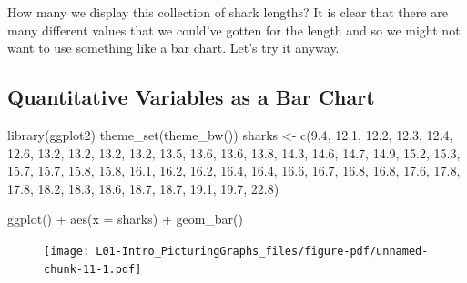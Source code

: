 \documentclass[
  letterpaper,
  DIV=11,
  numbers=noendperiod,
  oneside]{scrreprt}
\newenvironment{Shaded}{\begin{snugshade}}{\end{snugshade}}
\newcommand{\AttributeTok}[1]{\textcolor[rgb]{0.40,0.45,0.13}{#1}}
\newcommand{\FloatTok}[1]{\textcolor[rgb]{0.68,0.00,0.00}{#1}}
\newcommand{\FunctionTok}[1]{\textcolor[rgb]{0.28,0.35,0.67}{#1}}
\newcommand{\NormalTok}[1]{\textcolor[rgb]{0.00,0.23,0.31}{#1}}
\newcommand{\OtherTok}[1]{\textcolor[rgb]{0.00,0.23,0.31}{#1}}
\newcommand{\SpecialCharTok}[1]{\textcolor[rgb]{0.37,0.37,0.37}{#1}}
\begin{document}
How many we display this collection of shark lengths? It is clear that
there are many different values that we could've gotten for the length
and so we might not want to use something like a bar chart. Let's try it
anyway.

\hypertarget{quantitative-variables-as-a-bar-chart}{%
\subsection{Quantitative Variables as a Bar
Chart}\label{quantitative-variables-as-a-bar-chart}}

\begin{Shaded}
\begin{Highlighting}[]
\FunctionTok{library}\NormalTok{(ggplot2)}
\FunctionTok{theme\_set}\NormalTok{(}\FunctionTok{theme\_bw}\NormalTok{())}
\NormalTok{sharks }\OtherTok{\textless{}{-}}  \FunctionTok{c}\NormalTok{(}\FloatTok{9.4}\NormalTok{, }\FloatTok{12.1}\NormalTok{, }\FloatTok{12.2}\NormalTok{, }\FloatTok{12.3}\NormalTok{, }\FloatTok{12.4}\NormalTok{, }\FloatTok{12.6}\NormalTok{, }\FloatTok{13.2}\NormalTok{, }\FloatTok{13.2}\NormalTok{, }\FloatTok{13.2}\NormalTok{, }\FloatTok{13.2}\NormalTok{, }\FloatTok{13.5}\NormalTok{,}
\FloatTok{13.6}\NormalTok{, }\FloatTok{13.6}\NormalTok{, }\FloatTok{13.8}\NormalTok{, }\FloatTok{14.3}\NormalTok{, }\FloatTok{14.6}\NormalTok{, }\FloatTok{14.7}\NormalTok{, }\FloatTok{14.9}\NormalTok{, }\FloatTok{15.2}\NormalTok{, }\FloatTok{15.3}\NormalTok{, }\FloatTok{15.7}\NormalTok{, }\FloatTok{15.7}\NormalTok{,}
\FloatTok{15.8}\NormalTok{, }\FloatTok{15.8}\NormalTok{, }\FloatTok{16.1}\NormalTok{, }\FloatTok{16.2}\NormalTok{, }\FloatTok{16.2}\NormalTok{, }\FloatTok{16.4}\NormalTok{, }\FloatTok{16.4}\NormalTok{, }\FloatTok{16.6}\NormalTok{, }\FloatTok{16.7}\NormalTok{, }\FloatTok{16.8}\NormalTok{, }\FloatTok{16.8}\NormalTok{,}
\FloatTok{17.6}\NormalTok{, }\FloatTok{17.8}\NormalTok{, }\FloatTok{17.8}\NormalTok{, }\FloatTok{18.2}\NormalTok{, }\FloatTok{18.3}\NormalTok{, }\FloatTok{18.6}\NormalTok{, }\FloatTok{18.7}\NormalTok{, }\FloatTok{18.7}\NormalTok{, }\FloatTok{19.1}\NormalTok{, }\FloatTok{19.7}\NormalTok{, }\FloatTok{22.8}\NormalTok{)}

\FunctionTok{ggplot}\NormalTok{() }\SpecialCharTok{+} \FunctionTok{aes}\NormalTok{(}\AttributeTok{x =}\NormalTok{ sharks) }\SpecialCharTok{+} \FunctionTok{geom\_bar}\NormalTok{()}
\end{Highlighting}
\end{Shaded}

\begin{figure}[H]

{\centering \texttt{[image: L01-Intro\_PicturingGraphs\_files/figure-pdf/unnamed-chunk-11-1.pdf]}

}

\end{figure}
\end{document}
